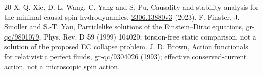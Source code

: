 \documentclass[11pt,a4paper]{article}
\begin{document}
\begin{thebibliography}{20}
 X.-Q. Xie, D.-L. Wang, C. Yang and S. Pu, Causality and stability analysis for the minimal causal spin hydrodynamics, \href{https://arxiv.org/abs/2306.13880v3}{2306.13880v3} (2023).
 F. Finster, J. Smoller and S.-T. Yau, Particlelike solutions of the Einstein--Dirac equations, \href{https://arxiv.org/abs/gr-qc/9801079}{gr-qc/9801079}, Phys. Rev. D 59 (1999) 104020; torsion-free static comparison, not a solution of the proposed EC collapse problem.
 J. D. Brown, Action functionals for relativistic perfect fluids, \href{https://arxiv.org/abs/gr-qc/9304026}{gr-qc/9304026} (1993); effective conserved-current action, not a microscopic spin action.
\end{thebibliography}
\end{document}

